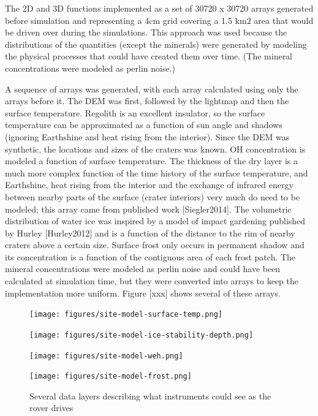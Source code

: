 \documentclass[twocolumn,letterpaper]{IEEEAerospaceCLS}  %
\begin{document}
The 2D and 3D functions implemented as a set of 30720 x 30720 arrays generated before simulation and representing a 4cm grid covering a 1.5 km2 area that would be driven over during the simulations.  This approach was used because the distributions of the quantities (except the minerals) were generated by modeling the physical processes that could have created them over time.  (The mineral concentrations were modeled as perlin noise.)

A sequence of arrays was generated, with each array calculated using only the arrays before it.  The DEM was first, followed by the lightmap and then the surface temperature.  Regolith is an excellent insulator, so the surface temperature can be approximated as a function of sun angle and shadows (ignoring Earthshine and heat rising from the interior).  Since the DEM was synthetic, the locations and sizes of the craters was known.  OH concentration is modeled a function of surface temperature.  The thickness of the dry layer is a much more complex function of the time history of the surface temperature, and Earthshine, heat rising from the interior and the exchange of infrared energy between nearby parts of the surface (crater interiors) very much do need to be modeled; this array came from published work [Siegler2014].  The volumetric distribution of water ice was inspired by a model of impact gardening published by Hurley [Hurley2012] and is a function of the distance to the rim of nearby craters above a certain size.  Surface frost only occurs in permanent shadow and its concentration is a function of the contiguous area of each frost patch.  The mineral concentrations were modeled as perlin noise and could have been calculated at simulation time, but they were converted into arrays to keep the implementation more uniform.  Figure [xxx] shows several of these arrays.

\begin{figure}[htp]
\begin{subfloat}{
\texttt{[image: figures/site-model-surface-temp.png]}
}
\end{subfloat}
\qquad
\begin{subfloat}{
\texttt{[image: figures/site-model-ice-stability-depth.png]}
}
\end{subfloat}
\qquad
\begin{subfloat}{
\texttt{[image: figures/site-model-weh.png]}
}
\end{subfloat}
\qquad
\begin{subfloat}{
\texttt{[image: figures/site-model-frost.png]}
}
\end{subfloat}
\caption{Several data layers describing what instruments could see as the rover drives\label{fig:sim-by-real}}
\end{figure}
\end{document}

